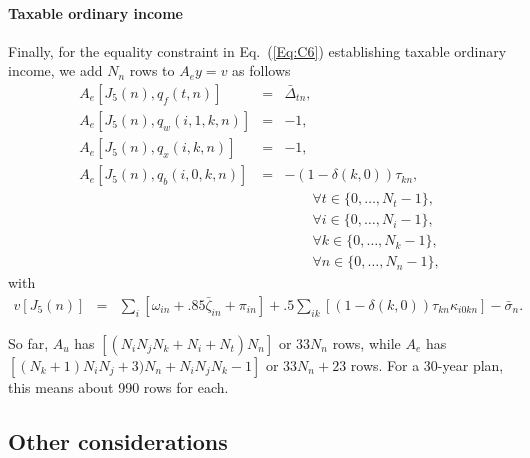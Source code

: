 \documentclass{article}[fleqn,12pt]
\begin{document}
\paragraph*{Taxable ordinary income}
Finally, for the equality constraint in Eq.~(\ref{Eq:C6}) establishing taxable
ordinary income, we add $N_n$ rows to $A_ey = v$ as follows
\begin{eqnarray}
	A_e[J_5(n), q_f(t, n)] &=& \bar{\Delta}_{t n}, \nonumber \\
	A_e[J_5(n), q_w(i, 1, k, n)] &=& -1, \nonumber \\
	A_e[J_5(n), q_x(i, k, n)] &=& -1, \nonumber \\
	A_e[J_5(n), q_b(i, 0, k, n)] &=& -(1-\delta(k, 0))\tau_{kn}, \\
	&&\qquad\forall t \in \{0,\ldots, N_t-1\},\nonumber\\
	&&\qquad\forall i \in \{0,\ldots, N_i-1\},\nonumber\\
	&&\qquad\forall k \in \{0,\ldots, N_k-1\},\nonumber\\
	&&\qquad\forall n \in \{0,\ldots, N_n-1\}, \nonumber
\end{eqnarray}
with
\begin{eqnarray}
	v[J_5(n)] &=& 
	\sum_i [\omega_{in} + .85\bar\zeta_{in}  + \pi_{in}]
	+ .5\sum_{ik} [(1-\delta(k, 0))\tau_{kn}\kappa_{i0kn}]
	- \bar{\sigma}_n.
\end{eqnarray}

So far, $A_u$ has $[(N_iN_jN_k + N_i + N_t)N_n]$ or $33N_n$ rows,
while $A_e$ has $[(N_k+1)N_iN_j + 3)N_n + N_iN_jN_k - 1]$ or $33N_n+23$ rows. For a 30-year
plan, this means about 990 rows for each.

\subsection{Other considerations}
\end{document}
